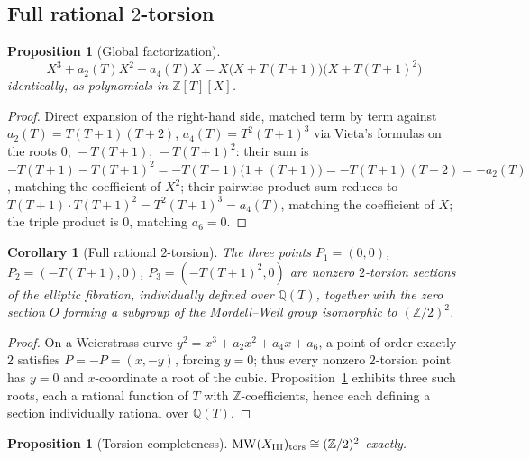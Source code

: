 \documentclass[11pt]{amsart}
\newtheorem{proposition}[theorem]{Proposition}
\newtheorem{corollary}[theorem]{Corollary}
\theoremstyle{definition}
\newcommand{\Q}{\mathbb{Q}}
\newcommand{\Z}{\mathbb{Z}}
\begin{document}
\subsection{Full rational $2$-torsion}

\begin{proposition}[Global factorization]
\label{prop:factorization}
\[
X^3+a_2(T)X^2+a_4(T)X = X\bigl(X+T(T+1)\bigr)\bigl(X+T(T+1)^2\bigr)
\]
identically, as polynomials in $\Z[T][X]$.
\end{proposition}

\begin{proof}
Direct expansion of the right-hand side, matched term by term against
$a_2(T)=T(T+1)(T+2)$, $a_4(T)=T^2(T+1)^3$ via Vieta's formulas on the
roots $0,\,-T(T+1),\,-T(T+1)^2$: their sum is $-T(T+1)-T(T+1)^2 =
-T(T+1)\bigl(1+(T+1)\bigr)=-T(T+1)(T+2)=-a_2(T)$, matching the coefficient
of $X^2$; their pairwise-product sum reduces to
$T(T+1)\cdot T(T+1)^2=T^2(T+1)^3=a_4(T)$, matching the coefficient of $X$;
the triple product is $0$, matching $a_6=0$.
\end{proof}

\begin{corollary}[Full rational $2$-torsion]
\label{cor:torsion}
The three points $P_1=(0,0)$, $P_2=(-T(T+1),0)$, $P_3=(-T(T+1)^2,0)$ are
nonzero $2$-torsion sections of the elliptic fibration, individually
defined over $\Q(T)$, together with the zero section $O$ forming a
subgroup of the Mordell--Weil group isomorphic to $(\Z/2)^2$.
\end{corollary}

\begin{proof}
On a Weierstrass curve $y^2=x^3+a_2x^2+a_4x+a_6$, a point of order exactly
$2$ satisfies $P=-P=(x,-y)$, forcing $y=0$; thus every nonzero $2$-torsion
point has $y=0$ and $x$-coordinate a root of the cubic. Proposition~\ref{prop:factorization}
exhibits three such roots, each a rational function of $T$ with $\Z$-coefficients,
hence each defining a section individually rational over $\Q(T)$.
\end{proof}

\begin{proposition}[Torsion completeness]
\label{prop:torsion-complete}
$\mathrm{MW}(X_{\rm III})_{\rm tors} \cong (\Z/2)^2$ exactly.
\end{proposition}
\end{document}
